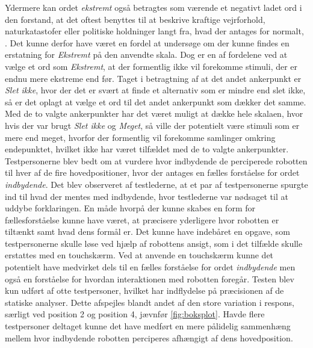 Ydermere kan ordet \textit{ekstremt} også betragtes som værende et negativt ladet ord i den forstand, at det oftest benyttes til at beskrive kraftige vejrforhold, naturkatastofer eller politiske holdninger langt fra, hvad der antages for normalt, \parencite{WEB:Oxford2017}. Det kunne derfor have været en fordel at undersøge om der kunne findes en erstatning for \textit{Ekstremt} på den anvendte skala. Dog er en af fordelene ved at vælge et ord som \textit{Ekstremt}, at der formentlig ikke vil forekomme stimuli, der er endnu mere ekstreme end før. Taget i betragtning af at det andet ankerpunkt er \textit{Slet ikke}, hvor der det er svært at finde et alternativ som er mindre end slet ikke, så er det oplagt at vælge et ord til det andet ankerpunkt som dækker det samme. Med de to valgte ankerpunkter har det været muligt at dække hele skalaen, hvor hvis der var brugt \textit{Slet ikke} og \textit{Meget}, så ville der potentielt være stimuli som er mere end meget, hvorfor der formentlig vil forekomme samlinger omkring endepunktet, hvilket ikke har været tilfældet med de to valgte ankerpunkter.\blankline
%
Testpersonerne blev bedt om at vurdere hvor indbydende de perciperede robotten til hver af de fire hovedpositioner, hvor der antages en fælles forståelse for ordet \textit{indbydende}. Det blev observeret af testlederne, at et par af testpersonerne spurgte ind til hvad der mentes med indbydende, hvor testlederne var nødsaget til at uddybe forklaringen. En måde hvorpå der kunne skabes en form for fællesforståelse kunne have været, at præcisere yderligere hvor robotten er tiltænkt samt hvad dens formål er. Det kunne have indebåret en opgave, som testpersonerne skulle løse ved hjælp af robottens ansigt, som i det tilfælde skulle erstattes med en touchskærm. Ved at anvende en touchskærm kunne det potentielt have medvirket dels til en fælles forståelse for ordet \textit{indbydende} men også en forståelse for hvordan interaktionen med robotten foregår. \blankline
%
Testen blev kun udført af otte testpersoner, hvilket har indflydelse på præcisionen af de statiske analyser. Dette afspejles blandt andet af den store variation i respons, særligt ved position 2 og position 4, jævnfør \autoref{fig:boksplot}. Havde flere testpersoner deltaget kunne det have medført en mere pålidelig sammenhæng mellem hvor indbydende robotten perciperes afhængigt af dens hovedposition. 



